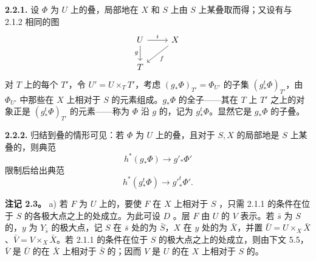 \textbf{2.2.1.} 设 $\Phi$ 为 $U$ 上的叠，局部地在 $X$ 和 $S$ 上由 $S$ 上某叠取而得；又设有与 2.1.2 相同的图
\[
\begin{tikzcd}
U\arrow[r,"i"]\arrow[d,"g"']&X\arrow[dl,"f"]\\
T&
\end{tikzcd}
\]
对 $T$ 上的每个 $T'$，令 $U'=U\times_TT'$，考虑 $(g_*\Phi)_{T'}=\Phi_{U'}$ 的子集 $(g_*^t\Phi)_{T'}$，由 $\Phi_{U'}$ 中那些在 $X$ 上相对于 $S$ 的元素组成。$g_*\Phi$ 的全子——其在 $T$ 上 $T'$ 之上的对象正是 $(g_*^t\Phi)_{T'}$ 的元素——称为 $\Phi$ 沿 $g$ 的，记为 $g_*^t\Phi$。显然它是 $g_*\Phi$ 的子叠。

\textbf{2.2.2.} 归结到叠的情形可见：若 $\Phi$ 为 $U$ 上的叠，且对于 $S,X$ 的局部地是 $S$ 上某叠的，则典范
\[h^*(g_*\Phi)\longrightarrow g'_*\Phi'\]
限制后给出典范
\[h^*(g_*^t\Phi)\longrightarrow {g'}_*^t\Phi'.\]

\textbf{注记 2.3。}
a) 若 $F$ 为 $U$ 上的，要使 $F$ 在 $X$ 上相对于 $S$ ，只需 2.1.1 的条件在位于 $S$ 的各极大点之上的处成立。为此可设 $D$ 。层 $F$ 由 $U$ 的 $V$ 表示。若 $\bar s$ 为 $S$ 的，$y$ 为 $Y_{\bar s}$ 的极大点，记 $S$ 在 $\bar s$ 处的为 $\bar S$，$X$ 在 $y$ 处的为 $\bar X$，并置 $\bar U=U\times_X\bar X$、$\bar V=V\times_X\bar X$。若 2.1.1 的条件在位于 $S$ 的极大点之上的处成立，则由下文 5.5，$\bar V$ 是 $\bar U$ 的在 $\bar X$ 上相对于 $\bar S$ 的；因而 $V$ 是 $U$ 的在 $X$ 上相对于 $S$ 的。

